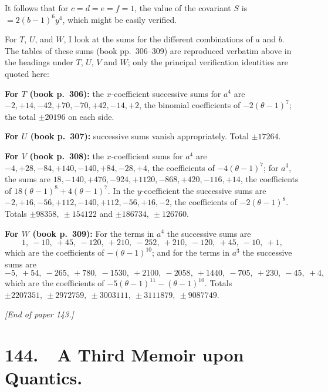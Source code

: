 \documentclass[11pt]{article}
\begin{document}
\medskip

It follows that for $c=d=e=f=1$, the value of the covariant $S$ is $= 2(b-1)^6 y^4$, which might be easily verified.

\bigskip

For $T$, $U$, and $W$, I look at the sums for the different combinations of $a$ and $b$. The tables of these sums (book pp.~306--309) are reproduced verbatim above in the headings under $T$, $U$, $V$ and $W$; only the principal verification identities are quoted here:

\medskip

\textbf{For $T$ (book p.~306):} the $x$-coefficient successive sums for $a^4$ are $-2, +14, -42, +70, -70, +42, -14, +2$, the binomial coefficients of $-2(\theta-1)^7$; the total $\pm 20196$ on each side.

\smallskip

\textbf{For $U$ (book p.~307):} successive sums vanish appropriately. Total $\pm 17264$.

\smallskip

\textbf{For $V$ (book p.~308):} the $x$-coefficient sums for $a^4$ are $-4, +28, -84, +140, -140, +84, -28, +4$, the coefficients of $-4(\theta-1)^7$; for $a^3$, the sums are $18, -140, +476, -924, +1120, -868, +420, -116, +14$, the coefficients of $18(\theta-1)^8 + 4(\theta-1)^7$. In the $y$-coefficient the successive sums are $-2, +16, -56, +112, -140, +112, -56, +16, -2$, the coefficients of $-2(\theta-1)^8$. Totals $\pm 98358,\ \pm 154122$ and $\pm 186734,\ \pm 126760$.

\smallskip

\textbf{For $W$ (book p.~309):} For the terms in $a^4$ the successive sums are
\[
1,\ -10,\ +45,\ -120,\ +210,\ -252,\ +210,\ -120,\ +45,\ -10,\ +1,
\]
which are the coefficients of $-(\theta-1)^{10}$; and for the terms in $a^3$ the successive sums are
\[
-5,\ +54,\ -265,\ +780,\ -1530,\ +2100,\ -2058,\ +1440,\ -705,\ +230,\ -45,\ +4,
\]
which are the coefficients of $-5(\theta-1)^{11} - (\theta-1)^{10}$. Totals $\pm 2207351,\ \pm 2972759,\ \pm 3003111,\ \pm 3111879,\ \pm 9087749$.

\bigskip

\noindent\textit{[End of paper 143.]}

\newpage
\section*{144.\ \ A Third Memoir upon Quantics.}
\end{document}
